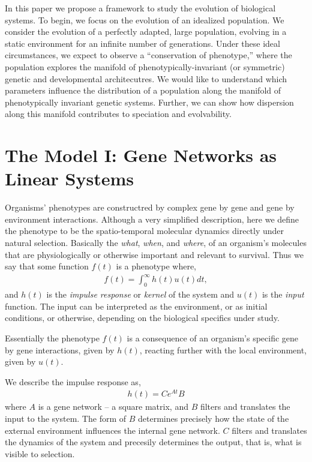 \documentclass[9 pt]{article}
\newcommand{\1}{\mathbbm{1}}
\begin{document}
\begin{multicols}{2}
In this paper we propose a framework to study the evolution of biological systems. To begin, we focus on the evolution of an idealized population. We consider the evolution of a perfectly adapted, large population, evolving in a static environment for an infinite number of generations. Under these ideal circumstances, we expect to observe a ``conservation of phenotype,'' where the population explores the manifold of phenotypically-invariant (or symmetric) genetic and developmental architecutres. We would like to understand which parameters influence the distribution of a population along the manifold of phenotypically invariant genetic systems. Further, we can show how dispersion along this manifold contributes to speciation and evolvability. 

\section*{The Model I: Gene Networks as Linear Systems}

  Organisms' phenotypes are constructred by complex gene by gene and gene by environment interactions. Although a very simplified description, here we define the phenotype to be the spatio-temporal molecular dynamics directly under natural selection. Basically the \emph{what}, \emph{when}, and \emph{where}, of an organism's molecules that are physiologically or otherwise important and relevant to survival. Thus we say that some function $f(t)$ is a phenotype where, 
  \begin{align}
    f(t) = \int_{0}^{\infty} h(t) u(t) dt  ,
  \end{align}
  and $h(t)$ is the \emph{impulse response} or \emph{kernel} of the system and $u(t)$ is the \emph{input} function. The input can be interpreted as the environment, or as initial conditions, or otherwise, depending on the biological specifics under study. 

  Essentially the phenotype $f(t)$ is a consequence of an organism's specific gene by gene interactions, given by $h(t)$, reacting further with the local environment, given by $u(t)$. 

  We describe the impulse response as, 
  \begin{align}
    h(t) = C e^{A t} B
  \end{align}
  where $A$ is a gene network -- a square matrix, and $B$ filters and translates the input to the system. The form of $B$ determines precisely how the state of the external environment influences the internal gene network. $C$ filters and translates the dynamics of the system and precesily determines the output, that is, what is visible to selection. 


\end{multicols}
\end{document}
